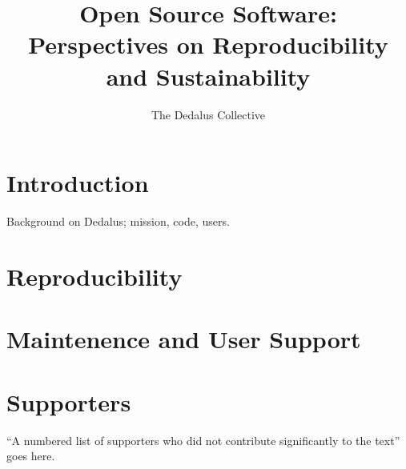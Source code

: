\documentclass{paper}
\title{Open Source Software: Perspectives on Reproducibility and Sustainability}
\author{The Dedalus Collective}
\begin{document}
\maketitle

\section{Introduction}
\label{sec:intro}

Background on Dedalus; mission, code, users.

\section{Reproducibility}
\label{sec:repro}

\section{Maintenence and User Support}
\label{sec:support}

\appendix

\section{Supporters}
\label{sec:supporters}

``A numbered list of supporters who did not contribute significantly to the text'' goes here.
\end{document}
